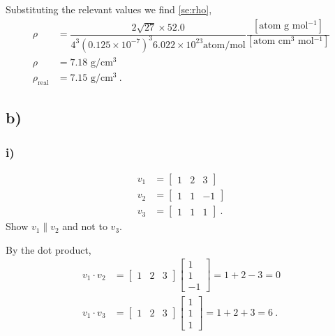 \documentclass[a4paper]{article}
\begin{document}
		Substituting the relevant values we find \cref{se:rho},
		\begin{subequations}
		\begin{align}
			\rho &= \dfrac{2 \sqrt{27} \times 52.0}{4^{3} \left(0.125 \times 10^{-7} \right)^{3} 6.022 \times 10^{23} \textrm{atom/mol}} \dfrac{[\textrm{atom g mol$^{-1}$}]}{[\textrm{atom cm$^{3}$ mol$^{-1}$}]}\\
			\rho &= 7.18 \textrm{ g/cm$^{3}$} \label{se:rho}\\
			\rho_{\textrm{real}} &= 7.15 \textrm{ g/cm$^{3}$}~.
		\end{align}
		\end{subequations}
		
		\subsection{b)}
		\subsubsection{i)}
		\begin{align}
			v_{1} &= \begin{bmatrix}
					1 & 2 & 3
					\end{bmatrix}\\
			v_{2} &= \begin{bmatrix}
					1 & 1 & -1
					\end{bmatrix}\\
			v_{3} &= \begin{bmatrix}
					1 & 1 & 1
					\end{bmatrix}~.
		\end{align}
		Show $v_{1} \parallel v_{2}$ and not to $v_{3}$.
		
		By the dot product,
		\begin{subequations}		
		\begin{align}
			v_{1} \cdot v_{2} &= \begin{bmatrix}
								1 & 2 & 3
								\end{bmatrix} 
								\begin{bmatrix}
								1\\
								1\\
								-1
								\end{bmatrix}
							    = 1 + 2 - 3 = 0\\
			v_{1} \cdot v_{3} &= \begin{bmatrix}
								1 & 2 & 3
								\end{bmatrix} 
								\begin{bmatrix}
								1\\
								1\\
								1
								\end{bmatrix}
								= 1 + 2 + 3 = 6~.
		\end{align}
		\end{subequations}
\end{document}
